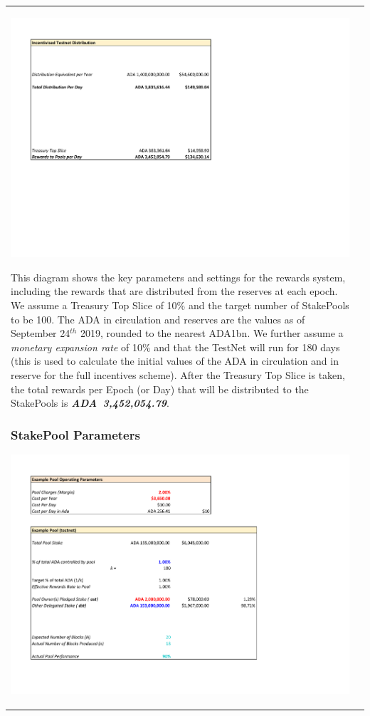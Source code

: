 \documentclass[11pt,a4paper,dvipsnames,twosided,final]{article}
\newcommand{\ada}{ADA{}}
\newcommand{\ADA}[1]{\textbf{\emph{\ada~{#1}}}}
\begin{document}
\begin{tabular}{||l|l||}
\begin{minipage}{\textwidth}
\noindent
\includegraphics[width=1.2\textwidth]{RCT2.pdf}
\vspace{-1.9in}

\noindent
This diagram shows the key parameters and settings for the rewards system, including the
rewards that are distributed from the reserves at each epoch.  We assume a Treasury Top Slice
of 10\% and the target number of StakePools to be 100.  The \ada{} in circulation and reserves
are the values as of September 24$^{th}$ 2019, rounded to the nearest ADA{1bn}.  We further
assume a \emph{monetary expansion rate} of 10\% and that the TestNet will run for 180 days
(this is used to calculate the initial values of the \ada{} in circulation and in reserve
for the full incentives scheme).  After the Treasury Top Slice is taken, the total
rewards per Epoch (or Day) that will be distributed to the StakePools is \ADA{3,452,054.79}.
\end{minipage}

\clearpage
\subsubsection*{StakePool Parameters}
\includegraphics[width=1.2\textwidth]{RCT3.pdf}
\vspace{-0.5in}


\end{tabular}
\end{document}
